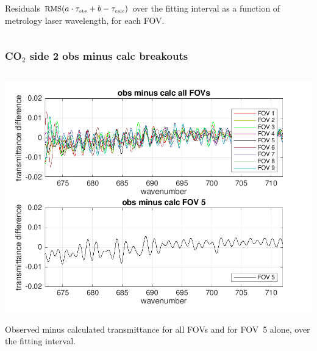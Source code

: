 \documentclass[10pt]{beamer}
\begin{document}
\begin{frame}
\begin{columns}[t]
\begin{column}{0.5\textwidth}
Residuals $\mbox{\small RMS}(a\cdot\tau_{\mbox{\tiny obs}} + b - \tau_{\mbox{\tiny calc}})$ over the fitting
interval as a function of metrology laser wavelength, for each FOV.

\end{column}
\end{columns}
\end{frame}
\begin{frame}
\frametitle{CO$_2$ side 2 obs minus calc breakouts}
\begin{columns}[t]
\begin{column}{0.5\textwidth}
  \begin{centering}
  \includegraphics[width=\textwidth]{01-19_pfh_s2_CO2/CO2_breakout_1.png}
  \end{centering}\vspace{3mm}

Observed minus calculated transmittance for all FOVs and for FOV~5
alone, over the fitting interval.


\end{column}
\end{columns}
\end{frame}
\end{document}
